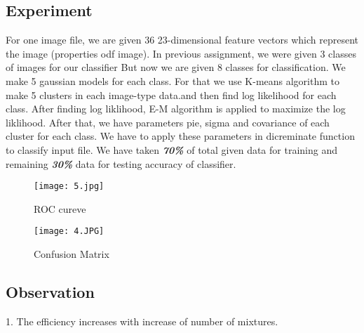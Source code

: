 \subsection{Experiment}
\begin{flushleft}
For one image file, we are given 36 23-dimensional feature vectors which represent the image (properties odf image). In previous assignment, we were given 3 classes of images for our classifier But now we are given 8 classes for classification. We make 5 gaussian models for each class. For that we use K-means algorithm to make 5 clusters in each image-type data.and then find log likelihood for each class.
After finding log liklihood, E-M algorithm is applied to maximize the log liklihood. After that, we have parameters pie, sigma and covariance of each cluster for each class. We have to apply these parameters in dicreminate function to classify input file.
We have taken \textbf{\textit{70\%}} of total given data for training and remaining \textbf{\textit{30\%}} data for testing accuracy of classifier.
  
\begin{figure}[!htb]
\begin{center}
  \texttt{[image: 5.jpg]}
  \caption{ROC cureve}\label{fig:fig_a}
\endminipage\hfill
\end{center}
\end{figure}
\break

\begin{figure}[!htb]
\begin{center}
  \texttt{[image: 4.JPG]}
  \caption{Confusion Matrix}\label{fig:fig_a}
\endminipage\hfill
\end{center}
\end{figure}

\end{flushleft}

\subsection{Observation}
\begin{flushleft}
  1. The efficiency increases with increase of number of mixtures.
\end{flushleft}

